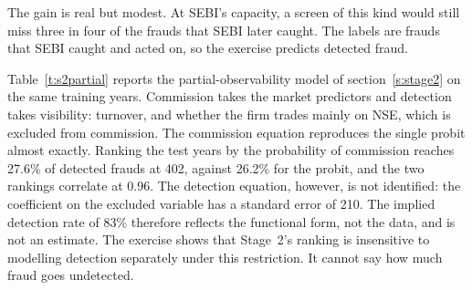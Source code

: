 \documentclass[letterpaper,11pt,leqno]{article}
\begin{document}
The gain is real but modest. At SEBI's capacity, a screen of this kind would still miss three in four of the frauds that SEBI later caught. The labels are frauds that SEBI caught and acted on, so the exercise predicts detected fraud.

Table~\ref{t:s2partial} reports the partial-observability model of section~\ref{s:stage2} on the same training years. Commission takes the market predictors and detection takes visibility: turnover, and whether the firm trades mainly on NSE, which is excluded from commission. The commission equation reproduces the single probit almost exactly. Ranking the test years by the probability of commission reaches 27.6\% of detected frauds at 402, against 26.2\% for the probit, and the two rankings correlate at 0.96. The detection equation, however, is not identified: the coefficient on the excluded variable has a standard error of 210. The implied detection rate of 83\% therefore reflects the functional form, not the data, and is not an estimate. The exercise shows that Stage~2's ranking is insensitive to modelling detection separately under this restriction. It cannot say how much fraud goes undetected.

\begin{table}[htb]
\caption{Partial observability: commission and detection}
{\footnotesize}
\label{t:s2partial}\end{table}

\begin{table}[htb]
\caption{Out-of-time prediction of fraud years}
{\footnotesize}
\label{t:s2}\end{table}
\end{document}
